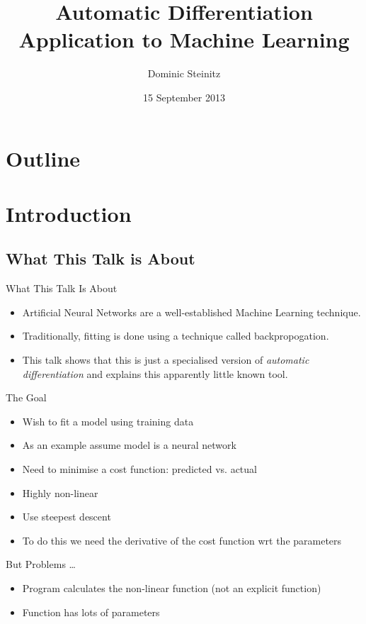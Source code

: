 \documentclass{beamer}
\title[Automatic differentiation and neural nets]{Automatic
  Differentiation\\Application to Machine Learning}
\author{Dominic Steinitz}
\institute{Kingston University}
\date{15 September 2013}
\begin{document}
\begin{frame}
\titlepage
\end{frame}

\section*{Outline}
    \frame{\tableofcontents}

\section{Introduction}

\subsection{What This Talk is About}

\begin{frame}{What This Talk Is About}
\begin{itemize}
\item
Artificial Neural Networks are a well-established Machine Learning
technique.
\item
Traditionally, fitting is done using a technique called
backpropogation.
\item
This talk shows that this is just a specialised
version of {\em automatic differentiation} and explains this apparently
little known tool.
\end{itemize}
\end{frame}

\begin{frame}{The Goal}
\begin{itemize}
\item
Wish to fit a model using training data
\item
As an example assume model is a neural network
\item
Need to minimise a cost function: predicted vs. actual
\item
Highly non-linear
\item
Use steepest descent
\item
To do this we need the derivative of the cost function wrt the parameters
\end{itemize}
\end{frame}

\begin{frame}{But Problems \ldots}
\begin{itemize}
\item
Program calculates the non-linear function (not an explicit function)
\item
Function has lots of parameters
\end{itemize}
\end{frame}
\end{document}
